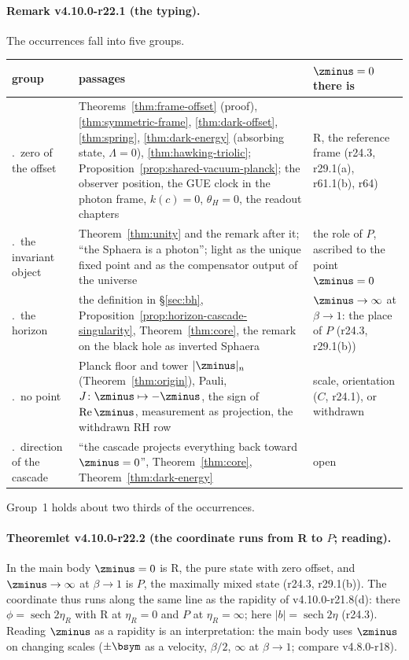 \paragraph{Remark v4.10.0-r22.1 (the typing).}
The occurrences fall into five groups.
\begin{center}
\small
\begin{tabular}{@{}>{\raggedright\arraybackslash}p{}>{\raggedright\arraybackslash}p{}>{\raggedright\arraybackslash}p{}@{}}
\toprule
group & passages & \(\zminus=0\) there is\\
\midrule
1.~zero of the offset & Theorems~\ref{thm:frame-offset} (proof), \ref{thm:symmetric-frame}, \ref{thm:dark-offset}, \ref{thm:spring}, \ref{thm:dark-energy} (absorbing state, \(\Lambda=0\)), \ref{thm:hawking-triolic}; Proposition~\ref{prop:shared-vacuum-planck}; the observer position, the GUE clock in the photon frame, \(k(c)=0\), \(\theta_H=0\), the readout chapters & R, the reference frame (r24.3, r29.1(a), r61.1(b), r64)\\
2.~the invariant object & Theorem~\ref{thm:unity} and the remark after it; ``the Sphaera is a photon''; light as the unique fixed point and as the compensator output of the universe & the role of \(P\), ascribed to the point \(\zminus=0\)\\
3.~the horizon & the definition in \S\ref{sec:bh}, Proposition~\ref{prop:horizon-cascade-singularity}, Theorem~\ref{thm:core}, the remark on the black hole as inverted Sphaera & \(\zminus\to\infty\) at \(\beta\to1\): the place of \(P\) (r24.3, r29.1(b))\\
4.~no point & Planck floor and tower \(|\zminus|_n\) (Theorem~\ref{thm:origin}), Pauli, \(J\colon\zminus\mapsto-\zminus\), the sign of \(\operatorname{Re}\zminus\), measurement as projection, the withdrawn RH row & scale, orientation (\(C\), r24.1), or withdrawn\\
5.~direction of the cascade & ``the cascade projects everything back toward \(\zminus=0\)'', Theorem~\ref{thm:core}, Theorem~\ref{thm:dark-energy} & open\\
\bottomrule
\end{tabular}
\end{center}
Group~1 holds about two thirds of the occurrences.

\paragraph{Theoremlet v4.10.0-r22.2 (the coordinate runs from R to \(P\); reading).}
In the main body \(\zminus=0\) is R, the pure state with zero offset, and \(\zminus\to\infty\) at \(\beta\to1\) is \(P\), the maximally mixed
state (r24.3, r29.1(b)).  The coordinate thus runs along the same line as the rapidity of v4.10.0-r21.8(d): there
\(\phi=\operatorname{sech}2\eta_R\) with R at \(\eta_R=0\) and \(P\) at \(\eta_R=\infty\); here \(|b|=\operatorname{sech}2\eta\) (r24.3).  Reading \(\zminus\) as a
rapidity is an interpretation: the main body uses \(\zminus\) on changing scales (\(\pm\bsym\) as a velocity, \(\beta/2\), \(\infty\) at \(\beta\to1\);
compare v4.8.0-r18).

